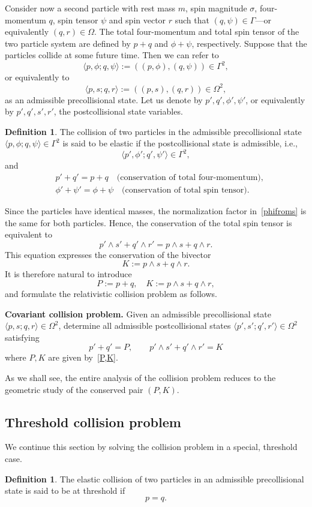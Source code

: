 \documentclass[12pt]{article}
\theoremstyle{plain}
\theoremstyle{definition}
\newtheorem{definition}[theorem]{Definition}
\begin{document}
Consider now a second particle with rest mass $m$, spin magnitude $\sigma$, four-momentum $q$, spin tensor $\psi$ and spin vector $r$ such that $(q,\psi)\in\Gamma$---or equivalently $(q,r)\in\Omega$. The total four-momentum and total spin tensor of the two particle system are defined by $p+q$ and $\phi+\psi$, respectively.
Suppose that the particles collide at some future time. Then we can refer to
\[
\langle p,\phi;q,\psi\rangle:=((p,\phi),(q,\psi))\in\Gamma^2,
\] 
or equivalently to
\[
\langle p,s;q,r\rangle:=((p,s),(q,r))\in\Omega^2,
\] 
as an admissible precollisional state. Let us denote by $p',q',\phi',\psi'$, or equivalently by $p',q',s',r'$, the postcollisional state variables.
\begin{definition}
The collision of two particles in the admissible precollisional state $\langle p,\phi;q,\psi\rangle\in\Gamma^2$ is said to be elastic if the postcollisional state is admissible, i.e.,  
\[
\langle p',\phi';q',\psi'\rangle\in\Gamma^2,
\] 
and
\begin{align*}
&p'+q'=p+q\quad \text{(conservation of total four-momentum),}\\
&\phi'+\psi'=\phi+\psi\quad  \text{(conservation of total spin tensor).}
\end{align*}
\end{definition}

Since the particles have identical masses, the normalization factor in~\eqref{phifroms} is the same for both particles. Hence, the conservation of the total spin tensor is equivalent to  
\[
p'\wedge s'+q'\wedge r'=p\wedge s+q\wedge r.
\]
This equation expresses the conservation of the bivector
\[
K:=p\wedge s+q\wedge r.
\]
It is therefore natural to introduce
\begin{equation}\label{P,K}
P:=p+q,\quad
K:=p\wedge s+q\wedge r,
\end{equation}
and formulate the relativistic collision problem as follows.

{\bf Covariant collision problem.} 
Given an admissible precollisional state $\langle p,s;q,r\rangle\in\Omega^2$, 
determine all admissible postcollisional states $\langle p',s';q',r'\rangle\in\Omega^2$
satisfying
\[
p'+q'=P,
\qquad
p'\wedge s'+q'\wedge r'=K
\]
where $P,K$ are given by~\eqref{P,K}.




As we shall see, the entire analysis of the collision problem reduces to the geometric study of the conserved pair $(P,K)$.

\subsection{Threshold collision problem}
We continue this section by solving the collision problem in a special, threshold case.
\begin{definition}
The elastic collision of two particles in an admissible precollisional state is said to be at threshold if
\[
p=q.
\]
\end{definition}
\end{document}
